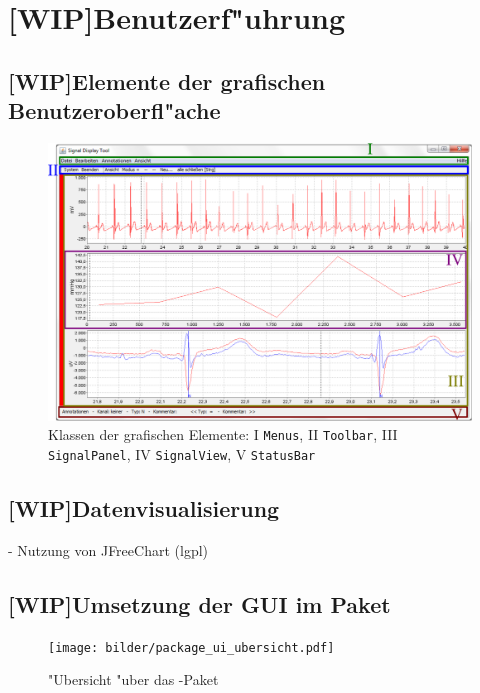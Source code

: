 \section{[WIP]Benutzerf"uhrung}

\subsection{[WIP]Elemente der grafischen Benutzeroberfl"ache}

\begin{figure}[htb]
\centering
\includegraphics[width=\textwidth]{bilder/programm_ansicht.eps}
\caption[Klassen der grafischen Elemente]{Klassen der grafischen Elemente: I \texttt{Menus}, II \texttt{Toolbar}, III \texttt{SignalPanel}, IV \texttt{SignalView}, V \texttt{StatusBar}}
\label{pic:gui_elements_and_classes}
\end{figure}

\subsection{[WIP]Datenvisualisierung}

- Nutzung von JFreeChart (\ac{lgpl})

\subsection{[WIP]Umsetzung der \ac{GUI} im Paket }

\begin{figure}[htb]
\centering
\texttt{[image: bilder/package\_ui\_ubersicht.pdf]}
\caption{"Ubersicht "uber das -Paket}
\label{pic:package_ui_ubersicht}
\end{figure}

